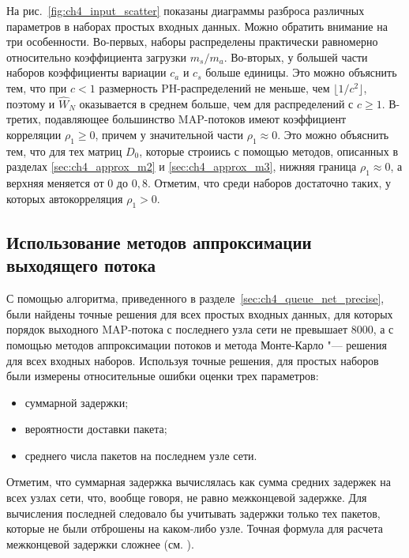 На рис.~\ref{fig:ch4_input_scatter} показаны диаграммы разброса различных параметров в наборах простых входных данных. Можно обратить внимание на три особенности. Во-первых, наборы распределены практически равномерно относительно коэффициента загрузки $m_s / m_a$. Во-вторых, у большей части наборов коэффициенты вариации $c_a$ и $c_s$ больше единицы. Это можно объяснить тем, что при $c < 1$ размерность PH-распределений не меньше, чем $\lfloor 1/c^2 \rfloor$, поэтому и $\hat{W}_N$ оказывается в среднем больше, чем для распределений с $c \geqslant 1$. В-третих, подавляющее большинство MAP-потоков имеют коэффициент корреляции $\rho_1 \geqslant 0$, причем у значительной части $\rho_1 \approx 0$. Это можно объяснить тем, что для тех матриц $D_0$, которые строиись с помощью методов, описанных в разделах \ref{sec:ch4_approx_m2} и \ref{sec:ch4_approx_m3}, нижняя граница $\rho_1 \approx 0$, а верхняя меняется от 0 до $0,8$. Отметим, что среди наборов достаточно таких, у которых автокорреляция $\rho_1 > 0$.



\subsection{Использование методов аппроксимации выходящего потока}

С помощью алгоритма, приведенного в разделе~\ref{sec:ch4_queue_net_precise}, были найдены точные решения для всех простых входных данных, для которых порядок выходного MAP-потока с последнего узла сети не превышает 8000, а с помощью методов аппроксимации потоков и метода Монте-Карло "--- решения для всех входных наборов. Используя точные решения, для простых наборов были измерены относительные ошибки оценки трех параметров:

\begin{itemize}
    \item суммарной задержки;
    \item вероятности доставки пакета;
    \item среднего числа пакетов на последнем узле сети.
\end{itemize}

Отметим, что суммарная задержка вычислялась как сумма средних задержек на всех узлах сети, что, вообще говоря, не равно межконцевой задержке. Для вычисления последней следовало бы учитывать задержки только тех пакетов, которые не были отброшены на каком-либо узле. Точная формула для расчета межконцевой задержки сложнее (см. \cite[p.~429]{VishnevskyDudin2018}).

